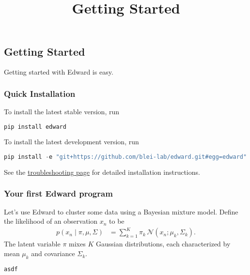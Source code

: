 \title{Getting Started}

\subsection{Getting Started}
Getting started with Edward is easy. 

\subsubsection{Quick Installation}
To install the latest stable version, run

\begin{lstlisting}[language=Java]
pip install edward
\end{lstlisting}

To install the latest development version, run

\begin{lstlisting}[language=Java]
pip install -e "git+https://github.com/blei-lab/edward.git#egg=edward"
\end{lstlisting}

See the \href{troubleshooting.html}{troubleshooting page} for detailed
installation instructions.


\subsubsection{Your first Edward program}

Let's use Edward to cluster some data using a Bayesian mixture model.
Define the likelihood of an observation $x_n$
to be
\begin{align*}
  p(x_{n} \mid \pi, \mu, \Sigma)
  &=
  \sum_{k=1}^K \pi_k \, \mathcal{N}(x_n ; \mu_k, \Sigma_k).
\end{align*}
The latent variable $\pi$ mixes $K$ Gaussian distributions, each 
characterized by mean $\mu_k$ and covariance $\Sigma_k$.

\begin{lstlisting}[language=Python]
  asdf
\end{lstlisting}
